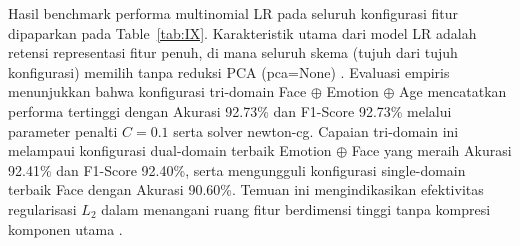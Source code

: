 Hasil benchmark performa multinomial LR pada seluruh konfigurasi fitur dipaparkan pada Table~\ref{tab:IX}. Karakteristik utama dari model LR adalah retensi representasi fitur penuh, di mana seluruh skema (tujuh dari tujuh konfigurasi) memilih tanpa reduksi PCA (pca=None) \cite{ref49}. Evaluasi empiris menunjukkan bahwa konfigurasi tri-domain Face $\oplus$ Emotion $\oplus$ Age mencatatkan performa tertinggi dengan Akurasi 92.73\% dan F1-Score 92.73\% melalui parameter penalti $C=0.1$ serta solver newton-cg. Capaian tri-domain ini melampaui konfigurasi dual-domain terbaik Emotion $\oplus$ Face yang meraih Akurasi 92.41\% dan F1-Score 92.40\%, serta mengungguli konfigurasi single-domain terbaik Face dengan Akurasi 90.60\%. Temuan ini mengindikasikan efektivitas regularisasi $L_2$ dalam menangani ruang fitur berdimensi tinggi tanpa kompresi komponen utama \cite{ref50}.

